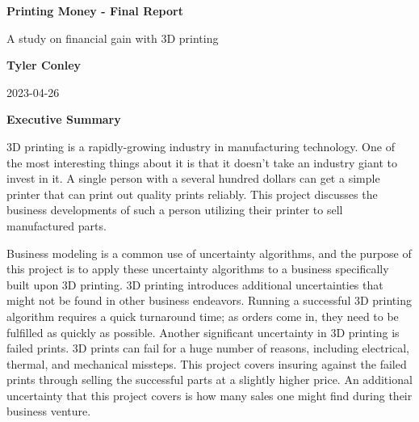 \documentclass[11pt]{article}
\begin{document}
\begin{titlepage}
    \begin{center}
        \vspace*{1in}

        \Huge
        \textbf{Printing Money - Final Report}

        \vspace{0.25in}
        \LARGE
        A study on financial gain with 3D printing

        \vspace{1 in}

        \textbf{Tyler Conley}

        \vspace{0.5in}
        2023-04-26


        \vfill
    \end{center}
\end{titlepage}


\begin{center}
    \LARGE
    \textbf{Executive Summary}
\end{center}

%

3D printing is a rapidly-growing industry in manufacturing technology. One of the most interesting
things about it is that it doesn't take an industry giant to invest in it. A single person with
a several hundred dollars can get a simple printer that can print out quality prints reliably. This
project discusses the business developments of such a person utilizing their printer to sell
manufactured parts.

Business modeling is a common use of uncertainty algorithms, and the purpose of this project is to
apply these uncertainty algorithms to a business specifically built upon 3D printing. 3D printing
introduces additional uncertainties that might not be found in other business endeavors. Running a
successful 3D printing algorithm requires a quick turnaround time; as orders come in, they need to
be fulfilled as quickly as possible. Another significant uncertainty in 3D printing is failed prints.
3D prints can fail for a huge number of reasons, including electrical, thermal, and mechanical missteps.
This project covers insuring against the failed prints through selling the successful parts at a slightly
higher price. An additional uncertainty that this project covers is how many sales one might find during
their business venture.
\end{document}
